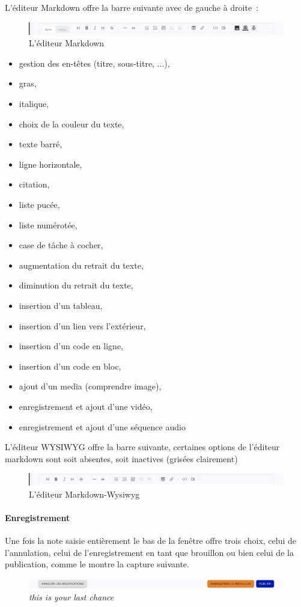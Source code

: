 L'éditeur Markdown offre la barre suivante avec de gauche à droite~:
\begin{figure}
	\centering
	\includegraphics{./Captures/portail.publications.creer.publication.barre.markdown.png}
	\caption{L'éditeur Markdown}
\end{figure}
\begin{itemize}
	\item gestion des en-têtes (titre, sous-titre, ...), 
	\item gras,
	\item italique,
	\item choix de la couleur du texte,
	\item texte barré,
	\item ligne horizontale,
	\item citation,
	\item liste pucée,
	\item liste numérotée,
	\item case de tâche à cocher,
	\item augmentation du retrait du texte,
	\item diminution du retrait du texte,
	\item insertion d'un tableau,
	\item insertion d'un lien vers l'extérieur,
	\item insertion d'un code en ligne,
	\item insertion d'un code en bloc,
	\item ajout d'un media (comprendre image),
	\item enregistrement et ajout d'une vidéo,
	\item enregistrement et ajout d'une séquence audio
\end{itemize}

L'éditeur WYSIWYG offre la barre suivante, certaines options de l'éditeur markdown sont soit absentes, soit inactives (grisées clairement)
\begin{figure}
	\centering
	\includegraphics{./Captures/portail.publications.creer.publication.barre.wysiwyg.png}
	\caption{L'éditeur Markdown-Wysiwyg}
\end{figure}

\paragraph{Enregistrement}
Une fois la note saisie entièrement le bas de la fenêtre offre trois choix, celui de l'annulation, celui de l'enregistrement en tant que brouillon ou bien celui de la publication, comme le montre la capture suivante.
\begin{figure}
	\centering
	\includegraphics{./Captures/portail.publications.creer.publication.3.png}
	\caption{\emph{this is your last chance}}
\end{figure}


